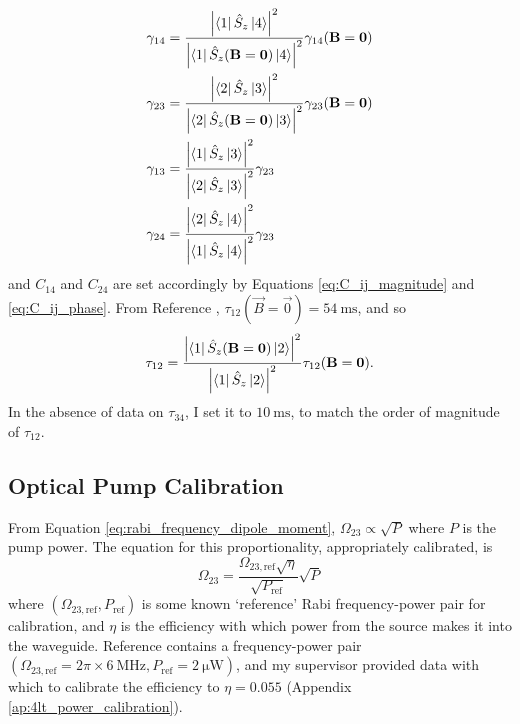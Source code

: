 \begin{equation}
\begin{split}
    \gamma_{14} &= \frac{\left|\left\langle1\right|\hat{S}_z\left|4\right\rangle\right|^2}{\left|\left\langle1\right|\hat{S}_z(\boldsymbol{\mathbf{B}}=\boldsymbol{\mathbf{0}})\left|4\right\rangle\right|^2} \gamma_{14}(\boldsymbol{\mathbf{B}}=\boldsymbol{\mathbf{0}})\\
    \gamma_{23} &= \frac{\left|\left\langle2\right|\hat{S}_z\left|3\right\rangle\right|^2}{\left|\left\langle2\right|\hat{S}_z(\boldsymbol{\mathbf{B}}=\boldsymbol{\mathbf{0}})\left|3\right\rangle\right|^2} \gamma_{23}(\boldsymbol{\mathbf{B}}=\boldsymbol{\mathbf{0}})\\
    \gamma_{13} &= \frac{\left|\left\langle1\right|\hat{S}_z\left|3\right\rangle\right|^2}{\left|\left\langle2\right|\hat{S}_z\left|3\right\rangle\right|^2} \gamma_{23}\\
    \gamma_{24} &= \frac{\left|\left\langle2\right|\hat{S}_z\left|4\right\rangle\right|^2}{\left|\left\langle1\right|\hat{S}_z\left|4\right\rangle\right|^2} \gamma_{23}\\
\end{split}
\label{eq:optical_relaxation_hybridisation}
\end{equation}
and $C_{14}$ and $C_{24}$ are set accordingly by Equations \ref{eq:C_ij_magnitude} and \ref{eq:C_ij_phase}. From Reference \cite{kindem_control_2020}, $\tau_{12}(\vec{B}=\vec{0}) = \qty{54}{\milli\second}$, and so
\begin{equation}
    \tau_{12} = \frac{\left|\left\langle1\right|\hat{S}_z(\boldsymbol{\mathbf{B}}=\boldsymbol{\mathbf{0}})\left|2\right\rangle\right|^2}{\left|\left\langle1\right|\hat{S}_z\left|2\right\rangle\right|^2} \tau_{12}(\boldsymbol{\mathbf{B}}=\boldsymbol{\mathbf{0}}). \label{eq:tau_12_hybridisation}
\end{equation}
In the absence of data on $\tau_{34}$, I set it to $\qty{10}{\milli\second}$, to match the order of magnitude of $\tau_{12}$.

\subsection{Optical Pump Calibration}
From Equation \ref{eq:rabi_frequency_dipole_moment}, $\Omega_{23} \propto \sqrt{P}$ where $P$ is the pump power. The equation for this proportionality, appropriately calibrated, is
\begin{equation}
    \Omega_{23} = \frac{\Omega_{23,\text{ref}}\sqrt{\eta}}{\sqrt{P_\text{ref}}} \sqrt{P}
\end{equation}
where $(\Omega_{23,\text{ref}}, P_\text{ref})$ is some known `reference' Rabi frequency-power pair for calibration, and $\eta$ is the efficiency with which power from the source makes it into the waveguide. Reference \cite{bartholomew_chip_2020} contains a frequency-power pair $(\Omega_{23,\text{ref}}=2\pi\times\qty{6}{\mega\hertz}, P_\text{ref}=\qty{2}{\micro\watt})$, and my supervisor provided data with which to calibrate the efficiency to $\eta=\num{0.055}$ (Appendix \ref{ap:4lt_power_calibration}). 

